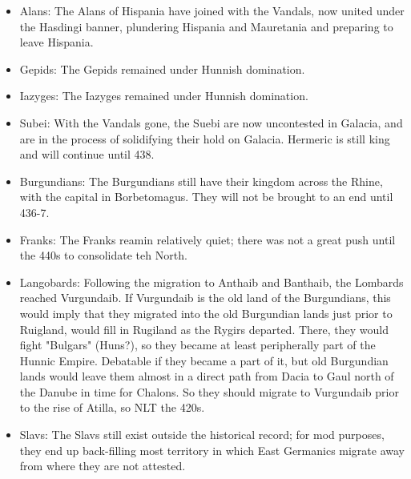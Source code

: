 \documentclass{article}
\begin{document}
\begin{itemize}
		\item Alans:\newline
		The Alans of Hispania have joined with the Vandals, now united under the Hasdingi banner, plundering Hispania and Mauretania and preparing to leave Hispania.
		
		\item Gepids:\newline
		The Gepids remained under Hunnish domination.
		
		\item Iazyges:\newline
		The Iazyges remained under Hunnish domination.
		
		\item Subei:\newline
		With the Vandals gone, the Suebi are now uncontested in Galacia, and are in the process of solidifying their hold on Galacia.
		Hermeric is still king and will continue until 438.
		
		\item Burgundians:\newline
		The Burgundians still have their kingdom across the Rhine, with the capital in Borbetomagus.
		They will not be brought to an end until 436-7.
		
		\item Franks:\newline
		The Franks reamin relatively quiet; there was not a great push until the 440s to consolidate teh North.
		
		\item Langobards:\newline
		Following the migration to Anthaib and Banthaib, the Lombards reached Vurgundaib.
		If Vurgundaib is the old land of the Burgundians, this would imply that they migrated into the old Burgundian lands just prior to Ruigland, would fill in Rugiland as the Rygirs departed.
		There, they would fight "Bulgars" (Huns?), so they became at least peripherally part of the Hunnic Empire.
		Debatable if they became a part of it, but old Burgundian lands would leave them almost in a direct path from Dacia to Gaul north of the Danube in time for Chalons.
		So they should migrate to Vurgundaib prior to the rise of Atilla, so NLT the 420s.
		
		\item Slavs:\newline
		The Slavs still exist outside the historical record; for mod purposes, they end up back-filling most territory in which East Germanics migrate away from where they are not attested.
	\end{itemize}
	
\end{document}
